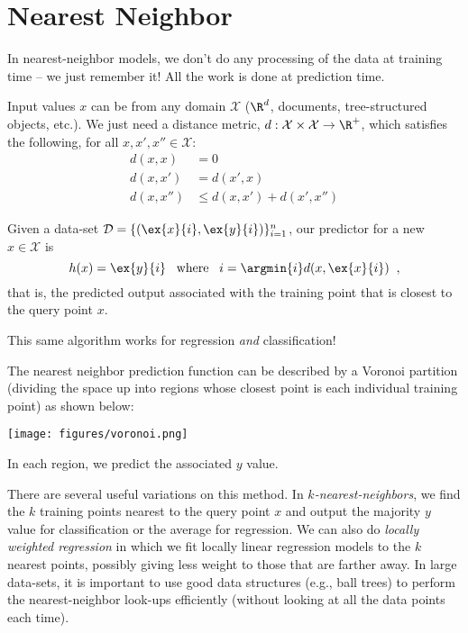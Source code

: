 \section{Nearest Neighbor}
\label{sec:np_nn}

In nearest-neighbor models, we don't do any processing of the data at
training time -- we just remember it!  All the work is done at
prediction time.  

Input values $x$ can be from any domain $\mathcal X$ ($\R^d$, documents,
tree-structured objects, etc.).
We just need a distance metric, $d: \mathcal X \times \mathcal X
\rightarrow \R^+$, which satisfies the following, for all $x, x', x'' \in
\mathcal X$:
\begin{align*}
d(x, x) &= 0 \\
d(x, x') &= d(x', x)\\
d(x, x'') &\leq d(x, x') + d(x', x'')
\end{align*}

Given a data-set $\mathcal D = \{(\ex{x}{i},\ex{y}{i})\}_{i=1}^n$, our
predictor for a new $x \in \mathcal X$ is 
\begin{equation}
  h(x) = \ex{y}{i} \;\;\;\text{where}\;\;\;i = \argmin{i} d(x,
  \ex{x}{i})\;\;,
  \end{equation}
that is, the predicted output associated with the training point that
is closest to the query point $x$.

This same algorithm works for regression {\em and} classification!

The nearest neighbor prediction function can be described by a Voronoi
partition (dividing the space up into regions whose closest point is
each individual training point) as shown below:
\begin{center}
\texttt{[image: figures/voronoi.png]}
\end{center}
In each region, we predict the associated $y$ value.

There are several useful variations on this method.  In {\em
  $k$-nearest-neighbors}, we find the $k$  training points nearest to
the query point $x$ and output the majority $y$ value for
classification or the average for regression.  We can also do {\em
  locally weighted regression} in which we fit locally linear
regression models to the $k$ nearest points, possibly giving less
weight to those that are farther away.  In large data-sets, it is
important to use good data structures (e.g., ball trees) to perform
the nearest-neighbor look-ups efficiently (without looking at all the
data points each time).






